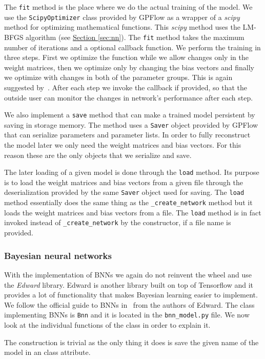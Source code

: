 \documentclass[12pt,a4paper,twoside]{scrartcl}
\numberwithin{equation}{section}
\newcommand{\refsec}[1]{\hyperref[#1]{Section \ref*{#1}}}
\begin{document}
The \texttt{fit} method is the place where we do the actual training of the model. We use the \texttt{ScipyOptimizer} class provided by GPFlow as a wrapper of a \emph{scipy} method for optimizing mathematical functions. This \emph{scipy} method uses the LM-BFGS algorithm (see \refsec{sec:nn}). The \texttt{fit} method takes the maximum number of iterations and a optional callback function. We perform the training in three steps. First we optimize the function while we allow changes only in the weight matrices, then we optimize only by changing the bias vectors and finally we optimize with changes in both of the parameter groups. This is again suggested by~\cite{mdntut}. After each step we invoke the callback if provided, so that the outside user can monitor the changes in network's performance after each step.

We also implement a \texttt{save} method that can make a trained model persistent by saving in storage memory. The method uses a \texttt{Saver} object provided by GPFlow that can serialize parameters and parameter lists. In order to fully reconstruct the model later we only need the weight matrices and bias vectors. For this reason these are the only objects that we serialize and save.

The later loading of a given model is done through the \texttt{load} method. Its purpose is to load the weight matrices and bias vectors from a given file through the deserialization provided by the same \texttt{Saver} object used for saving. The \texttt{load} method essentially does the same thing as the \texttt{\_create\_network} method but it loads the weight matrices and bias vectors from a file. The \texttt{load} method is in fact invoked instead of \texttt{\_create\_network} by the constructor, if a file name is provided.
\subsubsection{Bayesian neural networks}\label{sec:impl-bnn}
With the implementation of BNNs we again do not reinvent the wheel and use the \emph{Edward} library. Edward is another library built on top of Tensorflow and it provides a lot of functionality that makes Bayesian learning easier to implement. We follow the official guide to BNNs in~\cite{bnntut} from the authors of Edward. The class implementing BNNs is \texttt{Bnn} and it is located in the \texttt{bnn\_model.py} file. We now look at the individual functions of the class in order to explain it.

The construction is trivial as the only thing it does is save the given name of the model in an class attribute.
\end{document}
